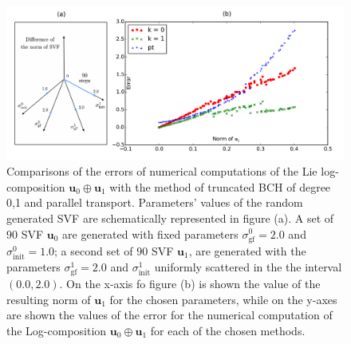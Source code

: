 \begin{figure}[!ht]
	\hspace{-1.5cm}
	\includegraphics[scale=0.6]{figures/SVF_scatter_plot.pdf}
	\caption{Comparisons of the errors of numerical computations of the Lie log-composition $\mathbf{u}_0\oplus \mathbf{u}_1$ with the method of truncated BCH of degree 0,1 and parallel transport. Parameters' values of the random generated SVF are schematically represented in figure (a). A set of $90$ SVF $\mathbf{u}_0$ are generated with fixed parameters $\sigma_{\text{gf}}^{0} = 2.0$ and $\sigma_{\text{init}}^{0} = 1.0$; a second set of $90$ SVF  $\mathbf{u}_1$, are generated with the parameters $\sigma_{\text{gf}}^{1} = 2.0$ and $\sigma_{\text{init}}^{1}$ uniformly scattered in the the interval $(0.0, 2.0)$. On the x-axis fo figure (b) is shown the value of the resulting norm of $\mathbf{u}_1$ for the chosen parameters, while on the y-axes are shown the values of the error for the numerical computation of the Log-composition $\mathbf{u}_0\oplus \mathbf{u}_1$ for each of the chosen methods.  }
	\label{fig:SVF_scatter_plot}
\end{figure}

